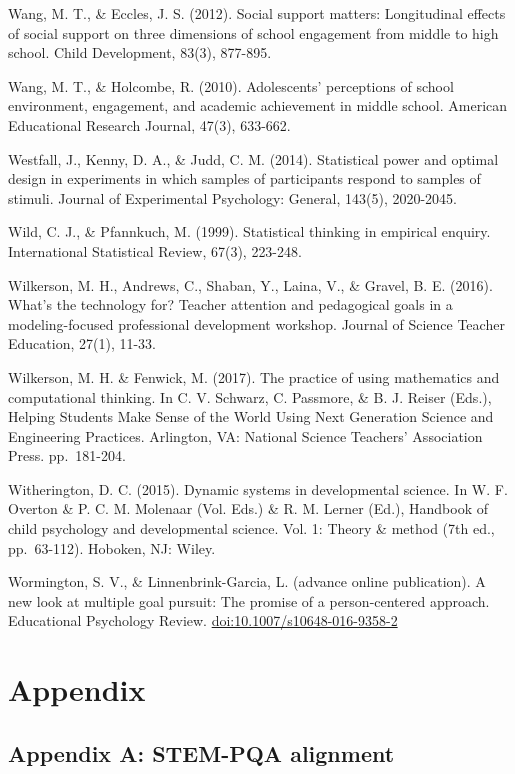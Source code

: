 \documentclass[]{msu-thesis}
\theoremstyle{definition}
\theoremstyle{definition}
\theoremstyle{definition}
\theoremstyle{remark}
\begin{document}
Wang, M. T., \& Eccles, J. S. (2012). Social support matters:
Longitudinal effects of social support on three dimensions of school
engagement from middle to high school. Child Development, 83(3),
877-895.

Wang, M. T., \& Holcombe, R. (2010). Adolescents' perceptions of school
environment, engagement, and academic achievement in middle school.
American Educational Research Journal, 47(3), 633-662.

Westfall, J., Kenny, D. A., \& Judd, C. M. (2014). Statistical power and
optimal design in experiments in which samples of participants respond
to samples of stimuli. Journal of Experimental Psychology: General,
143(5), 2020-2045.

Wild, C. J., \& Pfannkuch, M. (1999). Statistical thinking in empirical
enquiry. International Statistical Review, 67(3), 223-248.

Wilkerson, M. H., Andrews, C., Shaban, Y., Laina, V., \& Gravel, B. E.
(2016). What's the technology for? Teacher attention and pedagogical
goals in a modeling-focused professional development workshop. Journal
of Science Teacher Education, 27(1), 11-33.

Wilkerson, M. H. \& Fenwick, M. (2017). The practice of using
mathematics and computational thinking. In C. V. Schwarz, C. Passmore,
\& B. J. Reiser (Eds.), Helping Students Make Sense of the World Using
Next Generation Science and Engineering Practices. Arlington, VA:
National Science Teachers' Association Press. pp.~181-204.

Witherington, D. C. (2015). Dynamic systems in developmental science. In
W. F. Overton \& P. C. M. Molenaar (Vol. Eds.) \& R. M. Lerner (Ed.),
Handbook of child psychology and developmental science. Vol. 1: Theory
\& method (7th ed., pp.~63-112). Hoboken, NJ: Wiley.

Wormington, S. V., \& Linnenbrink-Garcia, L. (advance online
publication). A new look at multiple goal pursuit: The promise of a
person-centered approach. Educational Psychology Review.
\url{doi:10.1007/s10648-016-9358-2}

\chapter{Appendix}\label{appendix}

\section{Appendix A: STEM-PQA
alignment}\label{appendix-a-stem-pqa-alignment}
\end{document}
